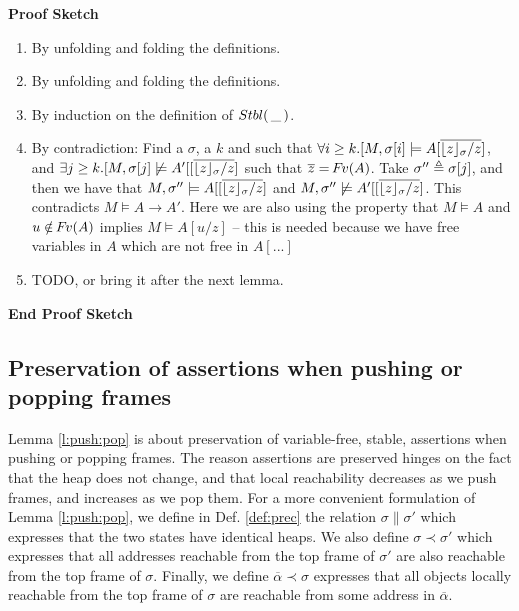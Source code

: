 {\noindent
\vspace{.1cm}
{\textbf{Proof Sketch}} 

\begin{enumerate}
\item
By unfolding and folding the definitions.
\item
By unfolding and folding the definitions.
\item
By induction on the definition of ${Stbl(\, \_\, )}$.
\item
By contradiction: Find a $\sigma$, a $k$ and   such that  
$\forall i\geq k.[M,{\sigma[i]} \models A[\overline{ {{\lfloor z \rfloor_{\sigma}}/ z}}]$, and
$\exists j\geq k.[M,{\sigma[j]} \not\models A'[[\overline{ {{\lfloor z \rfloor_{\sigma}}/ z}}]$
 such that $\overline z = {\hspace{-1pt}F\hspace{-1pt}}v(A)$.
 Take $\sigma''\triangleq  \sigma[j]$, and then we have that
 $M, \sigma'' \models A[[\overline{ {{\lfloor z \rfloor_{\sigma}}/ z}}]$ and  $M,  \sigma'' \not\models A'[[\overline{ {{\lfloor z \rfloor_{\sigma}}/ z}}]$.
 This contradicts $ M  \models A \rightarrow A'$.
 Here we are also using the property that $M \models A$  and $u\notin {\hspace{-1pt}F\hspace{-1pt}}v(A)$ implies $M \models A[u/z]$ -- this is needed because we have free variables in $A$ which are not free in $A[...]$ 
 {}
 {}
 \item
 TODO, or bring it after the next lemma.
\end{enumerate}
\noindent
{\textbf{End Proof Sketch}} 

\subsection{Preservation of assertions when pushing or popping frames}

Lemma \ref{l:push:pop} is  about preservation of variable-free, stable, assertions when pushing or popping frames. 
The reason assertions are preserved hinges on the fact that the heap does not change, and that  local reachability decreases as we push frames, and increases as we pop them.
 For a more convenient formulation of Lemma \ref{l:push:pop}, we define in Def. \ref{def:prec} the relation  $\sigma \parallel \sigma' $ which expresses that the two states have identical heaps. 
 We also define 
 $\sigma \prec \sigma'$ which expresses that all addresses reachable from the top frame of $\sigma'$ are also reachable from the top frame of $\sigma$. 
Finally, we define  $\overline \alpha \prec \sigma$ expresses that all objects locally reachable from the top frame of $\sigma$ are reachable from some address in $\overline \alpha$.
 
}

